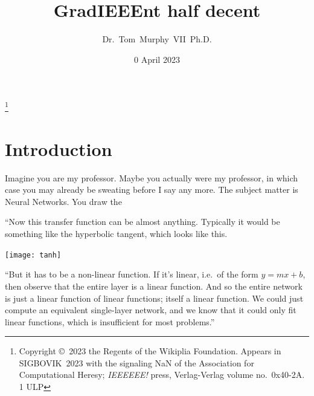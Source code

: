\documentclass[twocolumn]{article}
\begin{document}
\title{GradIEEEnt half decent}
\author{Dr.~Tom~Murphy~VII~Ph.D.}\thanks{
Copyright \copyright\ 2023 the Regents of the Wikiplia Foundation.
Appears in SIGBOVIK~2023 with the
signaling NaN
of the Association for Computational Heresy; {\em IEEEEEE!}
press, Verlag-Verlag volume no.~0x40-2A. 1 ULP
}

\renewcommand\th{\ensuremath{{}^{\textrm{th}}}}
\newcommand\st{\ensuremath{{}^{\textrm{st}}}}
\newcommand\rd{\ensuremath{{}^{\textrm{rd}}}}
\newcommand\nd{\ensuremath{{}^{\textrm{nd}}}}

\newcommand\gradone{{\sf grad1}}
\newcommand\downshifttwo{{\sf downshift2}}
\newcommand\plussixtyfour{{\sf plus64}}

\renewcommand\paragraph[1]{\smallskip \noindent{\bf #1}\enspace}

\date{0 April 2023}

\maketitle \thispagestyle{empty}

\sloppypar


\section{Introduction}



Imagine you are my professor. Maybe you actually were my professor, in
which case you may already be sweating before I say any more. The
subject matter is Neural Networks. You draw the

``Now this transfer function can be almost anything. Typically it
would be something like the hyperbolic tangent, which looks like this.

\begin{center}
\texttt{[image: tanh]}
\end{center}

``But it has to be a non-linear function. If it's linear, i.e.~of the
form $y = mx + b$, then observe that the entire layer is a linear
function. And so the entire network is just a linear function of
linear functions; itself a linear function. We could just compute an
equivalent single-layer network, and we know that it could only fit
linear functions, which is insufficient for most problems.''
\end{document}
